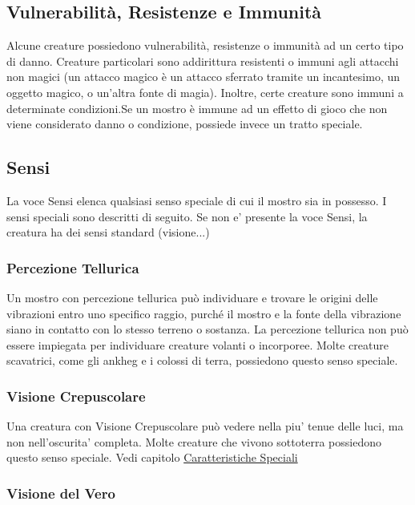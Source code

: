 \subsection{Vulnerabilità, Resistenze e Immunità}

Alcune creature possiedono vulnerabilità, resistenze o immunità ad un certo tipo di danno. Creature particolari sono addirittura resistenti o immuni agli attacchi non magici (un attacco magico è un attacco sferrato tramite un incantesimo, un oggetto magico, o un'altra fonte di magia). Inoltre, certe creature sono immuni a determinate condizioni.Se  un mostro è immune ad un effetto di gioco che non viene considerato danno o condizione, possiede invece un tratto speciale.

\subsection{Sensi}

La voce Sensi elenca qualsiasi senso speciale di cui il mostro sia in possesso. I sensi speciali sono descritti di seguito. Se non e' presente la voce Sensi, la creatura ha dei sensi standard (visione...)

\subsubsection{Percezione Tellurica}

Un mostro con percezione tellurica può individuare e trovare le origini delle vibrazioni entro uno specifico raggio, purché il mostro e la fonte della vibrazione siano in contatto con lo stesso terreno o sostanza. La percezione tellurica non può essere impiegata per individuare creature volanti o incorporee. Molte creature scavatrici, come gli ankheg e i colossi di terra, possiedono questo senso speciale.

\subsubsection{Visione Crepuscolare}

Una creatura con Visione Crepuscolare può vedere nella piu' tenue delle luci, ma non nell'oscurita' completa. Molte creature che vivono sottoterra possiedono questo senso
speciale.  Vedi capitolo \hyperref[sec:sec:visione-e-luce]{Caratteristiche Speciali}

\subsubsection{Visione del Vero}

